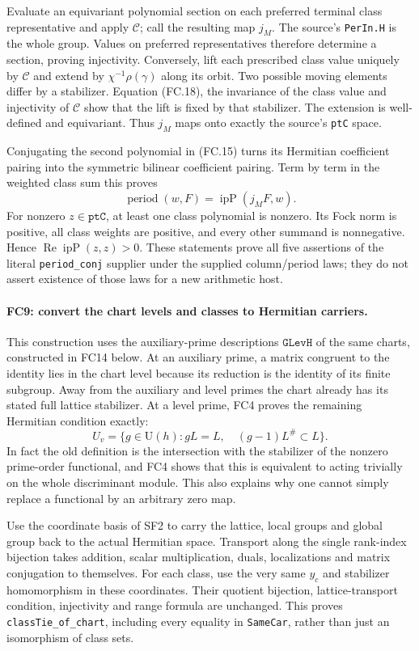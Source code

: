 \documentclass[11pt,a4paper]{article}
\numberwithin{equation}{section}
\theoremstyle{remark}\newtheorem{remark}[theorem]{Remark}
\begin{document}
Evaluate an equivariant polynomial section on each preferred terminal
class representative and apply $\mathcal C$; call the resulting map
$j_M$. The source's \texttt{PerIn.H} is the whole group. Values on
preferred representatives therefore determine a section, proving
injectivity. Conversely, lift each prescribed class value uniquely by
$\mathcal C$ and extend by $\chi^{-1}\rho(\gamma)$ along its orbit.
Two possible moving elements differ by a stabilizer. Equation (FC.18),
the invariance of the class value and injectivity of $\mathcal C$
show that the lift is fixed by that stabilizer. The extension is
well-defined and equivariant. Thus $j_M$ maps onto exactly
the source's \texttt{ptC} space.

Conjugating the second polynomial in (FC.15) turns its Hermitian
coefficient pairing into the symmetric bilinear coefficient pairing.
Term by term in the weighted class sum this proves
\[
 \operatorname{period}(w,F)=\operatorname{ipP}(j_MF,w).
 \tag{FC.19}
\]
For nonzero $z\in\texttt{ptC}$, at least one class polynomial is
nonzero. Its Fock norm is positive, all class weights are positive,
and every other summand is nonnegative. Hence
$\operatorname{Re}\operatorname{ipP}(z,z)>0$. These statements prove
all five assertions of the literal \texttt{period\_\allowbreak conj} supplier
under the supplied column/period laws; they do not assert existence of
those laws for a new arithmetic host.

\paragraph{FC9: convert the chart levels and classes to Hermitian
carriers.}
This construction uses the auxiliary-prime descriptions
$\texttt{GLevH}$ of the same charts, constructed in FC14 below. At an auxiliary prime, a matrix
congruent to the identity lies in the chart level because its reduction
is the identity of its finite subgroup. Away from the auxiliary and
level primes the chart already has its stated full lattice stabilizer.
At a level prime, FC4 proves the remaining Hermitian condition exactly:
\[
 U_v=\{g\in\mathrm U(h):gL=L,\quad
                    (g-1)L^\#\subset L\}.            \tag{FC.20}
\]
In fact the old definition is the intersection with the stabilizer of
the nonzero prime-order functional, and FC4 shows that this is equivalent
to acting trivially on the whole discriminant module. This also explains
why one cannot simply replace a functional by an arbitrary zero map.

Use the coordinate basis of SF2 to carry the lattice, local groups and
global group back to the actual Hermitian space. Transport along the
single rank-index bijection takes addition, scalar multiplication,
duals, localizations and matrix conjugation to themselves. For each
class, use the very same $y_c$ and stabilizer homomorphism in these
coordinates. Their quotient bijection, lattice-transport condition,
injectivity and range formula are unchanged. This proves
\texttt{classTie\_\allowbreak of\_\allowbreak chart}, including every equality in
\texttt{SameCar}, rather than just an isomorphism of class sets.
\end{document}
